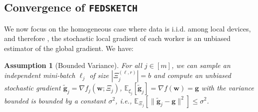 \documentclass[twoside]{article}
\newtheorem{assumption}{Assumption}
\begin{document}
\subsection{Convergence of  \texttt{FEDSKETCH} } 
\vspace{-0.05in}
We now focus on the homogeneous case where data is i.i.d. among local devices, and therefore 
, the stochastic local gradient of each worker is an unbiased estimator of the global gradient.
We have:
\begin{assumption}[Bounded Variance]\label{Assu:1.5}
For all $j\in [m]$, we can sample an independent mini-batch $\ell_j$   of size $|\Xi_j^{(\ell,r)}| = b$ and compute an unbiased stochastic gradient  $\tilde{\mathbf{g}}_j = \nabla f_j(\boldsymbol{w}; \Xi_j)$, $\mathbb{E}_{\xi_j}[\tilde{\mathbf{g}}_j] = \nabla f(\boldsymbol{w})=\mathbf{g}$ with  the variance bounded is bounded by a constant $\sigma^2$, i.e., $
\mathbb{E}_{\Xi_j}\left[\|\tilde{\mathbf{g}}_j-\mathbf{g}\|^2\right]\leq \sigma^2$.
\end{assumption}
\end{document}
